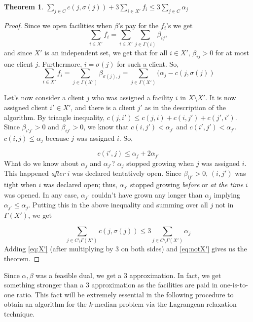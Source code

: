 \documentclass[11pt]{article}
\newtheorem{theorem}{Theorem}
\begin{document}
\begin{theorem}
$ \sum_{j\in C} c(j,\sigma(j)) + 3\sum_{i\in X'} f_i \le 3\sum_{j\in C}\alpha_j$
\end{theorem}
\begin{proof}
Since we open facilities when $\beta$'s pay for the $f_i$'s we get
$$\sum_{i\in X'} f_i = \sum_{i\in X'} \sum_{j\in \Gamma(i)} \beta_{ij} ,$$
and since $X'$ is an independent set, we get that for all $i\in X'$, $\beta_{ij} > 0$ for at most one client $j$.
Furthermore, $i = \sigma(j)$ for such a client.
So, 
\begin{equation}\label{eq:X'}
\sum_{i\in X'} f_i = \sum_{j\in \Gamma(X')} \beta_{\sigma(j),j} = \sum_{j\in \Gamma(X')}  (\alpha_j - c(j,\sigma(j))
\end{equation}

\noindent
Let's now consider a client $j$ who was assigned a facility $i$ in $X\setminus X'$. It is now assigned client $i'\in X'$, and there is a client $j'$ as  in the description of the algorithm. By triangle inequality,
$c(j,i') \le c(j,i) + c(i,j') + c(j',i') $. Since $\beta_{i'j'} > 0$ and $\beta_{ij'}>0$, we know that $c(i,j') < \alpha_{j'}$
and $c(i',j') < \alpha_{j'}$. $c(i,j) \le \alpha_j$ because $j$ was assigned $i$. So, 

$$c(i',j) \le \alpha_j + 2\alpha_{j'}$$
\noindent
What do we know about $\alpha_j$ and $\alpha_{j'}$? $\alpha_{j}$ stopped growing when $j$ was assigned $i$. This happened {\em after} $i$ was declared tentatively open. Since $\beta_{ij'} > 0$, $(i,j')$ was tight when 
$i$ was declared open; thus, $\alpha_{j'}$ stopped growing {\em before} or {\em at the time} $i$ was opened.
In any case, $\alpha_{j'}$ couldn't have grown any longer than $\alpha_j$ implying $\alpha_{j'} \le \alpha_j$. Putting this in the above inequality and summing over all $j$ not in $\Gamma(X')$, we get

\begin{equation}\label{eq:notX'}
\sum_{j\in C\setminus\Gamma(X')} c(j,\sigma(j)) \le 3\sum_{j\in C\setminus \Gamma(X')} \alpha_j
\end{equation}
Adding  \eqref{eq:X'} (after multiplying by $3$ on both sides) and \eqref{eq:notX'} gives us the theorem.
\end{proof}

Since $\alpha,\beta$ was a feasible dual, we get a $3$ approximation. In fact, we get something stronger than a $3$ approximation as the facilities are paid in one-is-to-one ratio. This fact will be extremely essential in 
the following procedure to obtain an algorithm for the $k$-median problem via the Lagrangean relaxation
technique.
\end{document}
